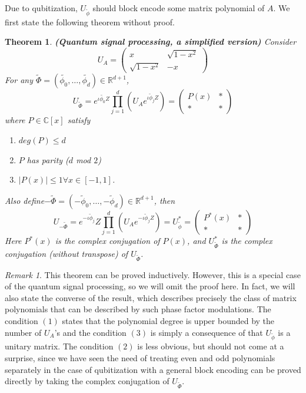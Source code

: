 \documentclass[12pt, oneside]{book}
\newtheorem{theorem}{Theorem}[section]
\theoremstyle{definition}
\theoremstyle{definition}
\theoremstyle{remark}
\newtheorem*{remark}{Remark}
\begin{document}
Due to qubitization, $U_{\tilde{\phi}}$ should block encode some matrix polynomial of $A$. We first state the following theorem without proof.

\begin{theorem}\label{the:QET}
    \textbf{(Quantum signal processing, a simplified version)} Consider
    \[
    U_A = \begin{pmatrix} x & \sqrt{1-x^2} \\ \sqrt{1-x^2} & -x \end{pmatrix}
    \]
    For any $\tilde{\Phi}=(\tilde{\phi_0},\ldots,\tilde{\phi_d}) \in \mathbb{R}^{d+1}$,
    \[
    U_{\tilde{\Phi}} =e^{\iota \tilde{\phi_0}Z}\prod_{j=1}^d (U_Ae^{\iota \tilde{\phi}_jZ}) = \begin{pmatrix} P(x) & * \\ * & * \end{pmatrix}
    \]
    where $P \in \mathbb{C}[x]$ satisfy
    \begin{enumerate}
        \item $deg(P)\leq d$
        \item $P$ has parity ($d$ mod $2$)
        \item $|P(x)|\leq 1 \forall x\in [-1,1]$.
    \end{enumerate}
    Also define$-\tilde{\Phi} = (-\tilde{\phi}_0,\ldots,-\tilde{\phi}_d) \in \mathbb{R}^{d+1}$, then
    \[
    U_{-\tilde{\Phi}} = e^{-\iota \tilde{\phi}_j}Z \prod_{j=1}^d (U_Ae^{-\iota \tilde{\phi}_jZ}) = U_{\tilde{\phi}}^* = \begin{pmatrix} P^*(x) & * \\ * & * \end{pmatrix}
    \]
    Here $P^*(x)$ is the complex conjugation of $P(x)$, and $U_{\tilde{\Phi}}^*$ is the complex conjugation (without transpose) of $U_{\tilde{\Phi}}$.
\end{theorem}

\begin{remark}
    This theorem can be proved inductively. However, this is a special case of the quantum signal processing, so we will omit the proof here. In fact, we will also state the converse of the result, which describes precisely the class of matrix polynomials that can be described by such phase factor modulations. The condition $(1)$ states that the polynomial degree is upper bounded by the number of $U_A$'s and the condition $(3)$ is simply a consequence of that $U_{\tilde{\phi}}$ is a unitary matrix. The condition $(2)$ is less obvious, but should not come at a surprise, since we have seen the need of treating even and odd polynomials separately in the case of qubitization with a general block encoding can be proved directly by taking the complex conjugation of $U_{\tilde{\Phi}}$.
\end{remark}
\end{document}
